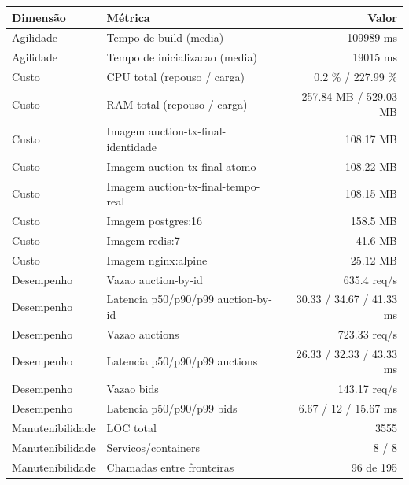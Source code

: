 \begin{quadro}[htb]
  \centering
  \caption{Métricas (auction, transacoes, snapshot-final).}
  \label{qua:metricas-auction-transacoes-snapshot-final}
  \renewcommand{\arraystretch}{1.15}
  \begin{tabular}{|l|l|r|}
    \hline
    \textbf{Dimensão} & \textbf{Métrica} & \textbf{Valor} \\
    \hline
    Agilidade & Tempo de build (media) & 109989 ms \\ \hline
    Agilidade & Tempo de inicializacao (media) & 19015 ms \\ \hline
    Custo & CPU total (repouso / carga) & 0.2 \% / 227.99 \% \\ \hline
    Custo & RAM total (repouso / carga) & 257.84 MB / 529.03 MB \\ \hline
    Custo & Imagem auction-tx-final-identidade & 108.17 MB \\ \hline
    Custo & Imagem auction-tx-final-atomo & 108.22 MB \\ \hline
    Custo & Imagem auction-tx-final-tempo-real & 108.15 MB \\ \hline
    Custo & Imagem postgres:16 & 158.5 MB \\ \hline
    Custo & Imagem redis:7 & 41.6 MB \\ \hline
    Custo & Imagem nginx:alpine & 25.12 MB \\ \hline
    Desempenho & Vazao auction-by-id & 635.4 req/s \\ \hline
    Desempenho & Latencia p50/p90/p99 auction-by-id & 30.33 / 34.67 / 41.33 ms \\ \hline
    Desempenho & Vazao auctions & 723.33 req/s \\ \hline
    Desempenho & Latencia p50/p90/p99 auctions & 26.33 / 32.33 / 43.33 ms \\ \hline
    Desempenho & Vazao bids & 143.17 req/s \\ \hline
    Desempenho & Latencia p50/p90/p99 bids & 6.67 / 12 / 15.67 ms \\ \hline
    Manutenibilidade & LOC total & 3555 \\ \hline
    Manutenibilidade & Servicos/containers & 8 / 8 \\ \hline
    Manutenibilidade & Chamadas entre fronteiras & 96 de 195 \\ \hline
  \end{tabular}
\end{quadro}
